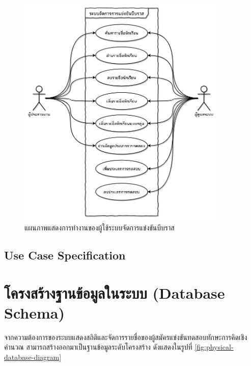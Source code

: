 \begin{figure}[H]
    \centering
    \includegraphics[width=100mm,scale=1.0]{diagrams/use-case-diagram.png}
    \caption{แผนภาพแสดงการทำงานของผู้ใช้ระบบจัดการแข่งขันบีบราส}
    \label{fig:use-case-diagram}
\end{figure}

\subsection{Use Case Specification}










\section{โครงสร้างฐานข้อมูลในระบบ (Database Schema)}

จากความต้องการของระบบแสดงสถิติและจัดการรายชื่อของผู้สมัครแข่งขันทดสอบทักษะการคิดเชิงคำนวณ สามารถสร้างออกมาเป็นฐานข้อมูลระดับโครงสร้าง ดังแสดงในรูปที่ \ref{fig:physical-database-diagram}

